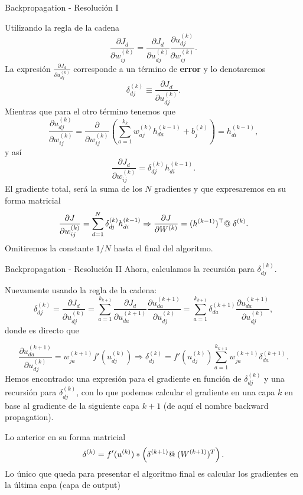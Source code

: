 \documentclass[handout, 9pt]{beamer}
\begin{document}
\begin{frame}{Backpropagation - Resolución I}

Utilizando la regla de la cadena 
\[
\frac{\partial J_d}{\partial w_{ij}^{(k)}} = \frac{\partial J_d}{\partial u_{dj}^{(k)}}\frac{\partial u_{dj}^{(k)}}{\partial w_{ij}^{(k)}}.
\] \pause
La expresión $\frac{\partial J_d}{\partial u_{dj}^{(k)}}$ corresponde a un término de \textbf{error} y lo denotaremos \
\[
\delta_{dj}^{(k)} \equiv \frac{\partial J_d}{\partial u_{dj}^{(k)}}.
\] \pause
Mientras que para el otro término tenemos que 
\[
\frac{\partial u_{dj}^{(k)}}{\partial w_{ij}^{(k)}} = \frac{\partial}{\partial w_{ij}^{(k)}} \left ( \sum_{a = 1}^{k_k}w_{aj}^{(k)}h_{da}^{(k-1)} + b_j^{(k)} \right) = h_{di}^{(k-1)},
\] \pause
y así 
\[
\frac{\partial J_d}{\partial w_{ij}^{(k)}} = \delta_{dj}^{(k)}  h_{di}^{(k-1)}.
\] \pause
El gradiente total, será la suma de los $N$ gradientes y que expresaremos en su forma matricial
\[\frac{\partial J}{\partial w_{ij}^{(k)}} = \sum_{d=1}^N \delta_{dj}^{(k)}  h_{di}^{(k-1)}  \Rightarrow  \frac{\partial J}{\partial W^{(k)}} = (h^{(k-1)})^\top @ \hspace{0.1cm} \delta^{(k)}.
\]
Omitiremos la constante $1/N$ hasta el final del algoritmo.
\end{frame}


\begin{frame}{Backpropagation - Resolución II}
Ahora, calculamos la recursión para $\delta_{dj}^{(k)}$. 

Nuevamente usando la regla de la cadena: \pause
\[
\delta_{dj}^{(k)} = \frac{\partial J_d}{\partial u_{dj}^{(k)}} = \sum_{a=1}^{k_{k+1}} \frac{\partial J_d}{\partial u_{da}^{(k+1)}} \frac{\partial u_{da}^{(k+1)}}{\partial u_{dj}^{(k)}} = \sum_{a=1}^{k_{k+1}} \delta_{da}^{(k+1)} \frac{\partial u_{da}^{(k+1)}}{\partial u_{dj}^{(k)}}, 
\] 
\pause 
donde es directo que

\[
\frac{\partial u_{da}^{(k+1)}}{\partial u_{dj}^{(k)}} = w_{ja}^{(k+1)}f'(u_{dj}^{(k)})  \Rightarrow  \delta_{dj}^{(k)} = f'(u_{dj}^{(k)})\sum_{a=1}^{k_{k+1}}w_{ja}^{(k+1)}\delta_{da}^{(k+1)}.
\]
\pause
Hemos encontrado: una expresión para el gradiente en función de $\delta_{dj}^{(k)}$ y una recursión para $\delta_{dj}^{(k)}$, con lo que podemos calcular el gradiente en una capa $k$ en base al gradiente de la siguiente capa $k+1$ (de aquí el nombre backward propagation).
\newline \pause

Lo anterior en su forma matricial
\[
\delta^{(k)} = f'(u^{(k)}) * \left ( \delta^{(k+1)} @ \hspace{0.1cm} (W^{(k+1)})^T \right ).
\] \pause
Lo único que queda para presentar el algoritmo final es calcular los gradientes en la última capa (capa de output)

\end{frame}
\end{document}
